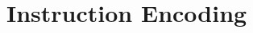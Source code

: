 \clearpage
\section{Instruction Encoding}\label{page:instruction-encoding}\label{section:instruction-header-formats}
